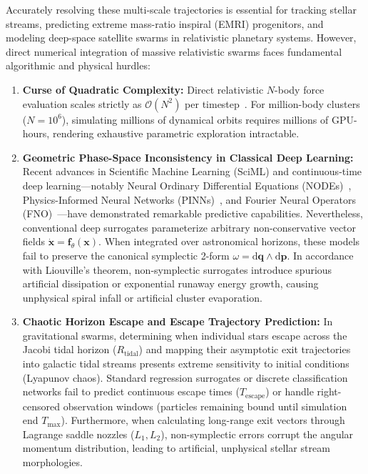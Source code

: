 \documentclass[preprint,12pt,3p]{elsarticle}
\begin{document}
Accurately resolving these multi-scale trajectories is essential for tracking stellar streams, predicting extreme mass-ratio inspiral (EMRI) progenitors, and modeling deep-space satellite swarms in relativistic planetary systems. However, direct numerical integration of massive relativistic swarms faces fundamental algorithmic and physical hurdles:
\begin{enumerate}
    \item \textbf{Curse of Quadratic Complexity:} Direct relativistic $N$-body force evaluation scales strictly as $\mathcal{O}(N^2)$ per timestep~\cite{wang2020massive,rein2015rebound}. For million-body clusters ($N = 10^6$), simulating millions of dynamical orbits requires millions of GPU-hours, rendering exhaustive parametric exploration intractable.
    \item \textbf{Geometric Phase-Space Inconsistency in Classical Deep Learning:} Recent advances in Scientific Machine Learning (SciML) and continuous-time deep learning---notably Neural Ordinary Differential Equations (NODEs)~\cite{chen2018neural}, Physics-Informed Neural Networks (PINNs)~\cite{raissi2019physics,karniadakis2021physics}, and Fourier Neural Operators (FNO)~\cite{li2021fourier}---have demonstrated remarkable predictive capabilities. Nevertheless, conventional deep surrogates parameterize arbitrary non-conservative vector fields $\dot{\bm{x}} = \bm{f}_{\theta}(\bm{x})$. When integrated over astronomical horizons, these models fail to preserve the canonical symplectic 2-form $\omega = \mathrm{d}\bm{q} \wedge \mathrm{d}\bm{p}$. In accordance with Liouville's theorem, non-symplectic surrogates introduce spurious artificial dissipation or exponential runaway energy growth, causing unphysical spiral infall or artificial cluster evaporation.
    \item \textbf{Chaotic Horizon Escape and Escape Trajectory Prediction:} In gravitational swarms, determining when individual stars escape across the Jacobi tidal horizon ($R_{\mathrm{tidal}}$) and mapping their asymptotic exit trajectories into galactic tidal streams presents extreme sensitivity to initial conditions (Lyapunov chaos). Standard regression surrogates or discrete classification networks fail to predict continuous escape times ($T_{\mathrm{escape}}$) or handle right-censored observation windows (particles remaining bound until simulation end $T_{\max}$). Furthermore, when calculating long-range exit vectors through Lagrange saddle nozzles ($L_1, L_2$), non-symplectic errors corrupt the angular momentum distribution, leading to artificial, unphysical stellar stream morphologies.
\end{enumerate}
\end{document}
